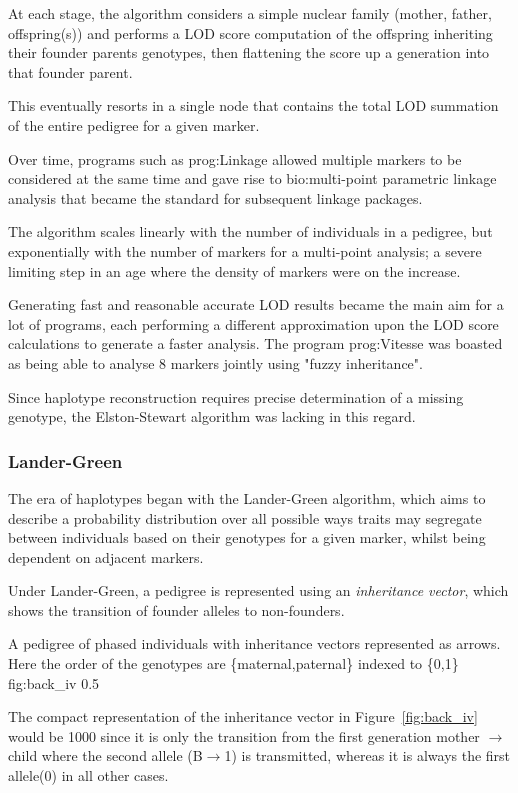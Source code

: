 At each stage, the algorithm considers a simple nuclear family (mother, father, offspring(s)) and performs a LOD score computation of the offspring inheriting their founder parents genotypes, then flattening the score up a generation into that founder parent.

This eventually resorts in a single node that contains the total LOD summation of the entire pedigree for a given marker.

Over time, programs such as \gls{prog:Linkage} allowed multiple markers to be considered at the same time and gave rise to \gls{bio:multi-point parametric} linkage analysis that became the standard for subsequent linkage packages.

The algorithm scales linearly with the number of individuals in a pedigree, but exponentially with the number of markers for a multi-point analysis; a severe limiting step in an age where the density of markers were on the increase.

Generating fast and reasonable accurate LOD results became the main aim for a lot of programs, each performing a different approximation upon the LOD score calculations to generate a faster analysis. The program \gls{prog:Vitesse} was boasted as being able to analyse 8 markers jointly using "fuzzy inheritance".

Since haplotype reconstruction requires precise determination of a missing genotype, the Elston-Stewart algorithm was lacking in this regard.

\subsubsection{Lander-Green}

The era of haplotypes began with the Lander-Green algorithm, which aims to describe a probability distribution over all possible ways traits may segregate between individuals based on their genotypes for a given marker, whilst being dependent on adjacent markers.

Under Lander-Green, a pedigree is represented using an \textit{inheritance vector}, which shows the transition of founder alleles to non-founders.

	{A pedigree of phased individuals with inheritance vectors represented as arrows. Here the order of the genotypes are \{maternal,paternal\} indexed to \{0,1\}}
	{fig:back_iv}
	{0.5}


The compact representation of the inheritance vector in Figure~\ref{fig:back_iv} would be 1000 since it is only the transition from the first generation mother \(\rightarrow\) child where the second allele (B\(\rightarrow\)1) is transmitted, whereas it is always the first allele(0) in all other cases.

